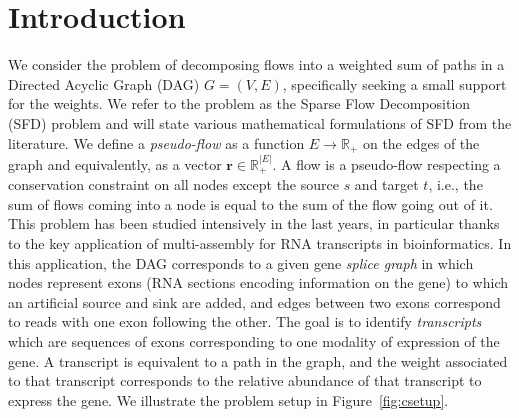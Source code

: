 \documentclass{ecai}
\newcommand{\vr}{\mathbf{r}}
\newcommand{\R}{\mathbb{R}}
\begin{document}

\section{Introduction}

We consider the problem of decomposing flows into a weighted sum of paths in a Directed Acyclic Graph (DAG) $G = (V,E)$, specifically seeking a small support for the weights.
We refer to the problem as the Sparse Flow Decomposition (SFD) problem and will state various mathematical formulations of SFD from the literature.
We define a \emph{pseudo-flow} as a function $E \rightarrow \R_+$ on the edges of the graph and equivalently, as a vector $\vr \in \R_+^{|E|}$.
A flow is a pseudo-flow respecting a conservation constraint on all nodes except the source $s$ and target $t$, i.e., the sum of flows coming into a node is equal to the sum of the flow going out of it.
This problem has been studied intensively in the last years, in particular thanks to the key application of multi-assembly for RNA transcripts in bioinformatics.
In this application, the DAG corresponds to a given gene \emph{splice graph} in which nodes represent exons (RNA sections encoding information on the gene) to which an artificial source and sink are added, and edges between two exons correspond to reads with one exon following the other.
The goal is to identify \emph{transcripts} which are sequences of exons corresponding to one modality of expression of the gene.
A transcript is equivalent to a path in the graph, and the weight associated to that transcript corresponds to the relative abundance of that transcript to express the gene.
We illustrate the problem setup in Figure~\ref{fig:csetup}.
\end{document}
